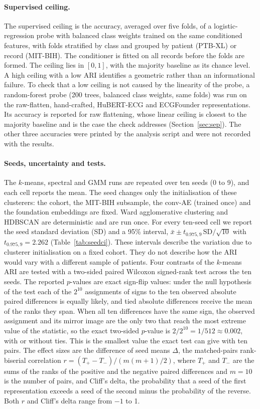 \documentclass[preprint,11pt]{elsarticle}
\begin{document}
\paragraph{Supervised ceiling.} The supervised ceiling is the accuracy, averaged over
five folds, of a logistic-regression probe with balanced class weights trained on the
same conditioned features, with folds stratified by class and grouped by patient
(PTB-XL) or record (MIT-BIH). The conditioner is fitted on all records before the folds
are formed. The ceiling lies in $[0,1]$, with the majority baseline as its chance level.
A high ceiling with a low ARI identifies a geometric rather than an
informational failure. To check that a low ceiling is not caused by the linearity of
the probe, a random-forest probe (200 trees, balanced class weights, same folds) was run
on the raw-flatten, hand-crafted, HuBERT-ECG and ECGFounder representations. Its accuracy
is reported for raw flattening, whose linear ceiling is closest to the majority baseline
and is the case the check addresses (Section~\ref{sec:sep}). The other three accuracies
were printed by the analysis script and were not recorded with the results.

\paragraph{Seeds, uncertainty and tests.} The $k$-means, spectral and GMM runs are
repeated over ten seeds (0 to 9), and each cell reports the mean. The seed changes only
the initialisation of these clusterers: the cohort, the MIT-BIH subsample, the
conv-AE (trained once) and the foundation embeddings are fixed. Ward agglomerative
clustering and HDBSCAN are deterministic and are run once. For every ten-seed cell we
report the seed standard deviation (SD) and a 95\% interval,
$\bar{x} \pm t_{0.975,9}\,\mathrm{SD}/\sqrt{10}$ with $t_{0.975,9}=2.262$
(Table~\ref{tab:seedci}). These intervals describe the variation due to clusterer
initialisation on a fixed cohort. They do not describe how the ARI would vary with a
different sample of patients. Four contrasts of the $k$-means ARI are tested with a
two-sided paired Wilcoxon signed-rank test across the ten seeds. The reported $p$-values
are exact sign-flip values: under the null hypothesis of the test each of the $2^{10}$
assignments of signs to the ten observed absolute paired differences is equally likely,
and tied absolute differences receive the mean of the ranks they span. When all ten
differences have the same sign, the observed assignment and its mirror image are the only
two that reach the most extreme value of the statistic, so the exact two-sided $p$-value is
$2/2^{10}=1/512\approx 0.002$, with or without ties. This is the smallest value the exact
test can give with ten pairs. The effect sizes are the difference of seed means $\Delta$,
the matched-pairs rank-biserial correlation $r=(T_+-T_-)/(m(m+1)/2)$, where $T_+$ and
$T_-$ are the sums of the ranks of the positive and the negative paired differences and
$m=10$ is the number of pairs, and Cliff's delta, the probability that a seed of the first
representation exceeds a seed of the second minus the probability of the reverse. Both $r$
and Cliff's delta range from $-1$ to 1.
\end{document}
